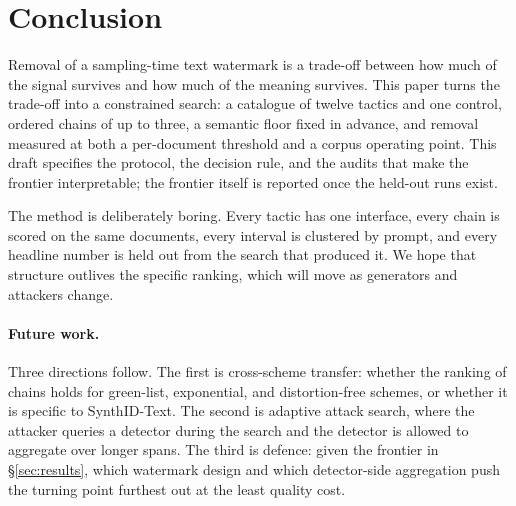 \section{Conclusion}
\label{sec:conclusion}

Removal of a sampling-time text watermark is a trade-off between how much of the signal survives and how much of the meaning survives. This paper turns the trade-off into a constrained search: a catalogue of twelve tactics and one control, ordered chains of up to three, a semantic floor fixed in advance, and removal measured at both a per-document threshold and a corpus operating point. This draft specifies the protocol, the decision rule, and the audits that make the frontier interpretable; the frontier itself is reported once the held-out runs exist.

The method is deliberately boring. Every tactic has one interface, every chain is scored on the same documents, every interval is clustered by prompt, and every headline number is held out from the search that produced it. We hope that structure outlives the specific ranking, which will move as generators and attackers change.

\paragraph{Future work.}
Three directions follow. The first is cross-scheme transfer: whether the ranking of chains holds for green-list, exponential, and distortion-free schemes, or whether it is specific to SynthID-Text. The second is adaptive attack search, where the attacker queries a detector during the search and the detector is allowed to aggregate over longer spans. The third is defence: given the frontier in \S\ref{sec:results}, which watermark design and which detector-side aggregation push the turning point furthest out at the least quality cost.
